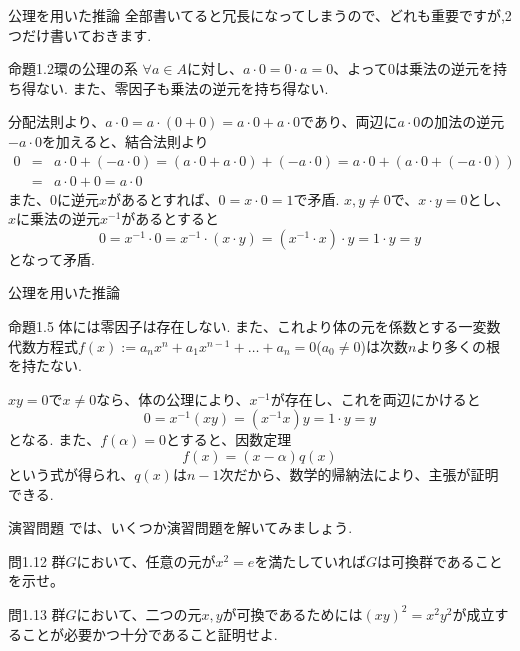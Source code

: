\documentclass[dvipdfmx,11pt,notheorems]{beamer}
\begin{document}
\begin{frame}{公理を用いた推論}
  全部書いてると冗長になってしまうので、どれも重要ですが,2つだけ書いておきます.
  \begin{alertblock}{命題1.2環の公理の系}
    $\forall a \in A$に対し、$a\cdot 0 = 0 \cdot a=0$、よって$0$は乗法の逆元を持ち得ない. また、零因子も乗法の逆元を持ち得ない.
  \end{alertblock}
  分配法則より、$a\cdot 0=a\cdot (0+0) =a\cdot 0+a\cdot 0$であり、両辺に$a\cdot 0$の加法の逆元$-a\cdot 0$を加えると、結合法則より
  \begin{eqnarray*}
    0 &=& a\cdot0+(-a\cdot0)=(a\cdot0+a\cdot0)+(-a\cdot0)=a\cdot0+(a\cdot0+(-a\cdot0))\\
    &=& a\cdot0+0 = a\cdot0
  \end{eqnarray*}
  また、$0$に逆元$x$があるとすれば、$0=x\cdot 0=1$で矛盾. $x,y\neq0$で、$x\cdot y=0$とし、$x$に乗法の逆元$x^{-1}$があるとすると
  \begin{equation*}
    0 = x^{-1}\cdot 0 = x^{-1}\cdot(x\cdot y)=(x^{-1}\cdot x)\cdot y=1\cdot y = y
  \end{equation*}
  となって矛盾.
\end{frame}
\begin{frame}{公理を用いた推論}
  \begin{alertblock}{命題1.5}
    体には零因子は存在しない. また、これより体の元を係数とする一変数代数方程式$f(x):=a_n x^n+a_1x^{n-1}+\ldots+a_n=0$($a_0\neq0$)は次数$n$より多くの根を持たない.
  \end{alertblock}
  $xy=0$で$x\neq0$なら、体の公理により、$x^{-1}$が存在し、これを両辺にかけると
  \begin{equation*}
    0 = x^{-1}(xy) = (x^{-1}x)y=1\cdot y = y
  \end{equation*}
  となる. また、$f(\alpha)=0$とすると、因数定理
  \begin{equation*}
    f(x) = (x-\alpha)q(x)
  \end{equation*}
  という式が得られ、$q(x)$は$n-1$次だから、数学的帰納法により、主張が証明できる.
\end{frame}
\begin{frame}{演習問題}
  では、いくつか演習問題を解いてみましょう.
  \begin{exampleblock}{問1.12}
    群$G$において、任意の元が$x^2 = e$を満たしていれば$G$は可換群であることを示せ。
  \end{exampleblock}
  \begin{exampleblock}{問1.13}
    群$G$において、二つの元$x,y$が可換であるためには$(xy)^2=x^2y^2$が成立することが必要かつ十分であること証明せよ.
  \end{exampleblock}
\end{frame}
\end{document}
